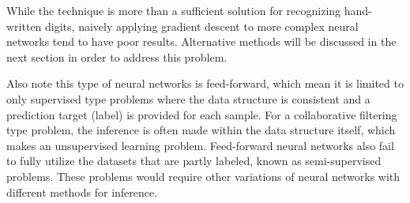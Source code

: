 
While the technique is more than a sufficient solution 
for recognizing hand-written digits,
naively applying gradient descent to more complex 
neural networks tend to have poor results.
Alternative methods will be discussed in the next section 
in order to address this problem.

Also note this type of neural networks is feed-forward, 
which mean it is limited to only supervised type problems
where the data structure is consistent 
and a prediction target (label) is provided for each sample.
For a collaborative filtering type problem,
the inference is often made within the data structure itself, 
which makes an unsupervised learning problem.
Feed-forward neural networks also fail to fully utilize 
the datasets that are partly labeled, 
known as semi-supervised problems.
These problems would require other variations of neural networks
with different methods for inference.






